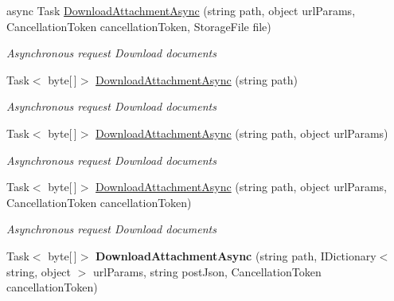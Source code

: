 \begin{DoxyCompactItemize}
async Task \hyperlink{class_accela_1_1_windows_store_s_d_k_1_1_accela_s_d_k_a96b22f6ec59dbd302d8e60a4bb4abe46}{Download\+Attachment\+Async} (string path, object url\+Params, Cancellation\+Token cancellation\+Token, Storage\+File file)
\begin{DoxyCompactList}\small\item\em Asynchronous request Download documents \end{DoxyCompactList}\item 
Task$<$ byte\mbox{[}$\,$\mbox{]}$>$ \hyperlink{class_accela_1_1_windows_store_s_d_k_1_1_accela_s_d_k_aaaaceac2c50a4d7621cca94f8ee53d8e}{Download\+Attachment\+Async} (string path)
\begin{DoxyCompactList}\small\item\em Asynchronous request Download documents \end{DoxyCompactList}\item 
Task$<$ byte\mbox{[}$\,$\mbox{]}$>$ \hyperlink{class_accela_1_1_windows_store_s_d_k_1_1_accela_s_d_k_a46090e22a41728d80b6fd9d4ca66dfa2}{Download\+Attachment\+Async} (string path, object url\+Params)
\begin{DoxyCompactList}\small\item\em Asynchronous request Download documents \end{DoxyCompactList}\item 
Task$<$ byte\mbox{[}$\,$\mbox{]}$>$ \hyperlink{class_accela_1_1_windows_store_s_d_k_1_1_accela_s_d_k_a06860c7b804461ba133a52abba67df30}{Download\+Attachment\+Async} (string path, object url\+Params, Cancellation\+Token cancellation\+Token)
\begin{DoxyCompactList}\small\item\em Asynchronous request Download documents \end{DoxyCompactList}\item 
\hypertarget{class_accela_1_1_windows_store_s_d_k_1_1_accela_s_d_k_aa201a490241bfab7f98499b6494e4a04}{Task$<$ byte\mbox{[}$\,$\mbox{]}$>$ {\bfseries Download\+Attachment\+Async} (string path, I\+Dictionary$<$ string, object $>$ url\+Params, string post\+Json, Cancellation\+Token cancellation\+Token)}\label{class_accela_1_1_windows_store_s_d_k_1_1_accela_s_d_k_aa201a490241bfab7f98499b6494e4a04}


\end{DoxyCompactItemize}
